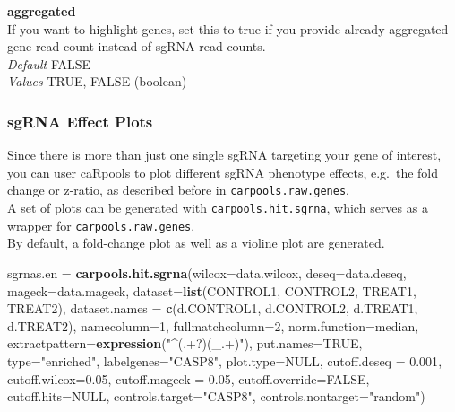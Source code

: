\documentclass[]{article}
\newenvironment{Shaded}{\begin{snugshade}}{\end{snugshade}}
\newcommand{\KeywordTok}[1]{\textcolor[rgb]{0.13,0.29,0.53}{\textbf{{#1}}}}
\newcommand{\DataTypeTok}[1]{\textcolor[rgb]{0.13,0.29,0.53}{{#1}}}
\newcommand{\DecValTok}[1]{\textcolor[rgb]{0.00,0.00,0.81}{{#1}}}
\newcommand{\FloatTok}[1]{\textcolor[rgb]{0.00,0.00,0.81}{{#1}}}
\newcommand{\StringTok}[1]{\textcolor[rgb]{0.31,0.60,0.02}{{#1}}}
\newcommand{\OtherTok}[1]{\textcolor[rgb]{0.56,0.35,0.01}{{#1}}}
\newcommand{\NormalTok}[1]{{#1}}
\begin{document}
\textbf{aggregated}\\
If you want to highlight genes, set this to true if you provide already
aggregated gene read count instead of sgRNA read counts.\\
\emph{Default} FALSE\\
\emph{Values} TRUE, FALSE (boolean)

\subsubsection{sgRNA Effect Plots}\label{sgrna-effect-plots}

Since there is more than just one single sgRNA targeting your gene of
interest, you can user caRpools to plot different sgRNA phenotype
effects, e.g.~the fold change or z-ratio, as described before in
\texttt{carpools.raw.genes}.\\
A set of plots can be generated with \texttt{carpools.hit.sgrna}, which
serves as a wrapper for \texttt{carpools.raw.genes}.\\
By default, a fold-change plot as well as a violine plot are generated.

\begin{Shaded}
\begin{Highlighting}[]
\NormalTok{sgrnas.en =}\StringTok{ }\KeywordTok{carpools.hit.sgrna}\NormalTok{(}\DataTypeTok{wilcox=}\NormalTok{data.wilcox, }\DataTypeTok{deseq=}\NormalTok{data.deseq,}
    \DataTypeTok{mageck=}\NormalTok{data.mageck, }\DataTypeTok{dataset=}\KeywordTok{list}\NormalTok{(CONTROL1, CONTROL2, TREAT1, TREAT2),}
    \DataTypeTok{dataset.names =} \KeywordTok{c}\NormalTok{(d.CONTROL1, d.CONTROL2, d.TREAT1, d.TREAT2), }\DataTypeTok{namecolumn=}\DecValTok{1}\NormalTok{,}
    \DataTypeTok{fullmatchcolumn=}\DecValTok{2}\NormalTok{, }\DataTypeTok{norm.function=}\NormalTok{median, }\DataTypeTok{extractpattern=}\KeywordTok{expression}\NormalTok{(}\StringTok{"^(.+?)(_.+)"}\NormalTok{),}
    \DataTypeTok{put.names=}\OtherTok{TRUE}\NormalTok{, }\DataTypeTok{type=}\StringTok{"enriched"}\NormalTok{, }\DataTypeTok{labelgenes=}\StringTok{"CASP8"}\NormalTok{, }\DataTypeTok{plot.type=}\OtherTok{NULL}\NormalTok{, }
    \DataTypeTok{cutoff.deseq =} \FloatTok{0.001}\NormalTok{, }\DataTypeTok{cutoff.wilcox=}\FloatTok{0.05}\NormalTok{, }\DataTypeTok{cutoff.mageck =} \FloatTok{0.05}\NormalTok{,}
    \DataTypeTok{cutoff.override=}\OtherTok{FALSE}\NormalTok{, }\DataTypeTok{cutoff.hits=}\OtherTok{NULL}\NormalTok{, }\DataTypeTok{controls.target=}\StringTok{"CASP8"}\NormalTok{, }\DataTypeTok{controls.nontarget=}\StringTok{"random"}\NormalTok{)}
\end{Highlighting}
\end{Shaded}
\end{document}
